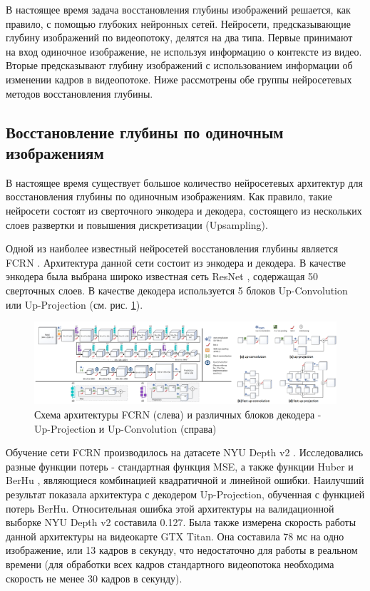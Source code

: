 \documentclass{mipt-thesis-ms}
\begin{document}
	В настоящее время задача восстановления глубины изображений решается, как правило, с помощью глубоких нейронных сетей. Нейросети, предсказывающие глубину изображений по видеопотоку, делятся на два типа. Первые принимают на вход одиночное изображение, не используя информацию о контексте из видео. Вторые предсказывают глубину изображений с использованием информации об изменении кадров в видеопотоке. Ниже рассмотрены обе группы нейросетевых методов восстановления глубины.
	
	\subsection{Восстановление глубины по одиночным изображениям}
	
	В настоящее время существует большое количество нейросетевых архитектур для восстановления глубины по одиночным изображениям. Как правило, такие нейросети состоят из сверточного энкодера и декодера, состоящего из нескольких слоев развертки и повышения дискретизации (Upsampling).
	
	Одной из наиболее известный нейросетей восстановления глубины является FCRN \cite{laina2016deeper}. Архитектура данной сети состоит из энкодера и декодера. В качестве энкодера была выбрана широко известная сеть ResNet \cite{he2016deep}, содержащая 50 сверточных слоев. В качестве декодера используется 5 блоков Up-Convolution или Up-Projection (см. рис. \ref{figure_upconv_upproj}).
	
	\begin{figure}
		\includegraphics[width=1.0\textwidth]{img/fcrn_scheme_full.png}
		\caption{Схема архитектуры FCRN (слева) и различных блоков декодера - Up-Projection и Up-Convolution (справа)}
		\label{figure_upconv_upproj}
	\end{figure}

	Обучение сети FCRN производилось на датасете NYU Depth v2 \cite{silberman2012indoor}. Исследовались разные функции потерь - стандартная функция MSE, а также функции Huber и BerHu \cite{owen2007robust} \cite{zwald2012berhu}, являющиеся комбинацией квадратичной и линейной ошибки. Наилучший результат показала архитектура с декодером Up-Projection, обученная с функцией потерь BerHu. Относительная ошибка этой архитектуры на валидационной выборке NYU Depth v2 составила 0.127. Была также измерена скорость работы данной архитектуры на видеокарте GTX Titan. Она составила 78 мс на одно изображение, или 13 кадров в секунду, что недостаточно для работы в реальном времени (для обработки всех кадров стандартного видеопотока необходима скорость не менее 30 кадров в секунду).
	
\end{document}
